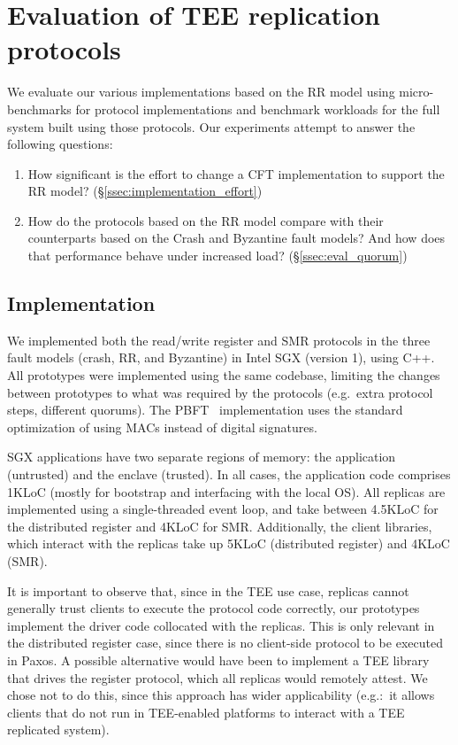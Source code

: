 \section{Evaluation of \ac{TEE} replication protocols}

We evaluate our various implementations based on the \ac{RR}
model using micro-benchmarks for protocol implementations and
benchmark workloads for the full system built using those
protocols. Our experiments attempt to answer the following
questions:

\begin{enumerate}
    \item How significant is the effort to change a \ac{CFT}
        implementation to support the \ac{RR} model?
        (\S\ref{ssec:implementation_effort})
    \item How do the protocols based on the \ac{RR} model
      compare with their counterparts based on the Crash and Byzantine
      fault models? And how does that performance behave under increased load?  (\S\ref{ssec:eval_quorum})
\end{enumerate}

\subsection{Implementation}\label{ssec:impl}

We implemented both the read/write register and SMR protocols in
the three fault models (crash, \ac{RR}, and Byzantine) in Intel
SGX (version 1), using C++. All prototypes were implemented using
the same codebase, limiting the changes between prototypes to
what was required by the protocols (e.g.\ extra protocol steps,
different quorums). The PBFT~\cite{pbft} implementation uses the
standard optimization of using MACs instead of digital
signatures.

SGX applications have two separate regions of memory: the
application (untrusted) and the enclave (trusted). In all cases,
the application code comprises 1KLoC (mostly for bootstrap and
interfacing with the local \ac{OS}). All replicas are implemented
using a single-threaded event loop, and take between 4.5KLoC for
the distributed register and 4KLoC for \ac{SMR}. Additionally, the client libraries, which
interact with the replicas take up 5KLoC (distributed
register) and 4KLoC (\ac{SMR}).

It is important to observe that, since in the \ac{TEE} use case,
replicas cannot generally trust clients to execute the protocol
code correctly, our prototypes implement the driver code
collocated with the replicas. This is only relevant in the
distributed register case, since there is no client-side protocol
to be executed in Paxos. A possible alternative would have been
to implement a \ac{TEE} library that drives the register
protocol, which all replicas would remotely attest. We chose
not to do this, since this approach has wider applicability
(e.g.:\ it allows clients that do not run in \ac{TEE}-enabled
platforms to interact with a \ac{TEE} replicated system).


